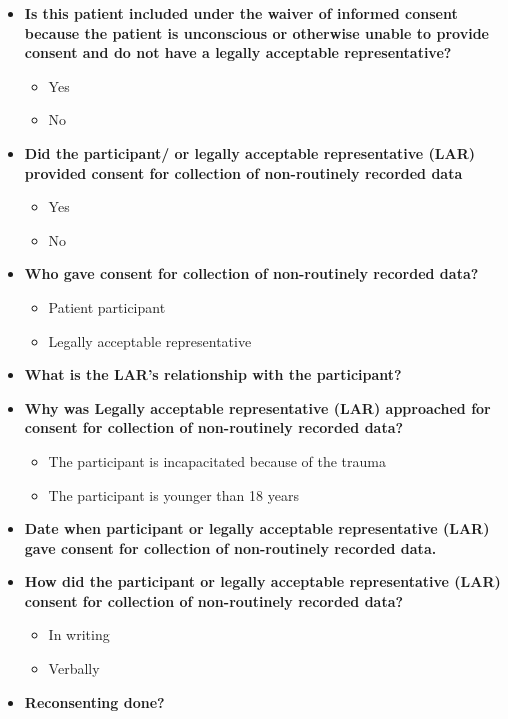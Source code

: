 \documentclass[
]{scrartcl}
\providecommand{\tightlist}{%
  \setlength{\itemsep}{0pt}\setlength{\parskip}{0pt}}\usepackage{longtable,booktabs,array}
\begin{document}
\begin{itemize}
\item
  \textbf{Is this patient included under the waiver of informed consent
  because the patient is unconscious or otherwise unable to provide
  consent and do not have a legally acceptable representative?}

  \begin{itemize}
  \tightlist
  \item
    Yes
  \item
    No
  \end{itemize}
\item
  \textbf{Did the participant/ or legally acceptable representative
  (LAR) provided consent for collection of non-routinely recorded data}

  \begin{itemize}
  \tightlist
  \item
    Yes
  \item
    No
  \end{itemize}
\item
  \textbf{Who gave consent for collection of non-routinely recorded
  data?}

  \begin{itemize}
  \tightlist
  \item
    Patient participant
  \item
    Legally acceptable representative
  \end{itemize}
\item
  \textbf{What is the LAR's relationship with the participant?}
\item
  \textbf{Why was Legally acceptable representative (LAR) approached for
  consent for collection of non-routinely recorded data?}

  \begin{itemize}
  \tightlist
  \item
    The participant is incapacitated because of the trauma
  \item
    The participant is younger than 18 years
  \end{itemize}
\item
  \textbf{Date when participant or legally acceptable representative
  (LAR) gave consent for collection of non-routinely recorded data.}
\item
  \textbf{How did the participant or legally acceptable representative
  (LAR) consent for collection of non-routinely recorded data?}

  \begin{itemize}
  \tightlist
  \item
    In writing
  \item
    Verbally
  \end{itemize}
\item
  \textbf{Reconsenting done?}


\end{itemize}
\end{document}
